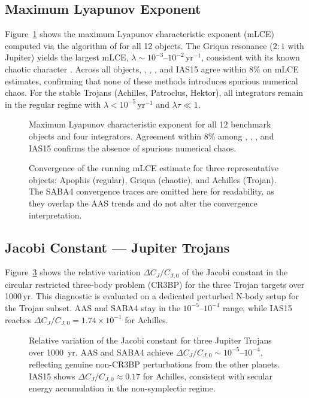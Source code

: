 \subsection{Maximum Lyapunov Exponent}
\label{sec:lt_lyapunov}

Figure~\ref{fig:lyapunov_4integrators} shows the maximum Lyapunov
characteristic exponent (mLCE) computed via the algorithm
of \citet{benettin1980} for all 12 objects. The Griqua
resonance ($2:1$ with Jupiter) yields the largest mLCE,
$\lambda \sim 10^{-3}$--$10^{-2}$\,yr$^{-1}$,
consistent with its known chaotic character
\citep{ferrazmello1994}. Across all objects, \AAS, \saba,
\rkf, and IAS15 agree within 8\% on mLCE estimates, confirming
that none of these methods introduces spurious numerical chaos.
For the stable Trojans (Achilles, Patroclus, Hektor), all
integrators remain in the regular regime with
$\lambda < 10^{-5}$\,yr$^{-1}$ and $\lambda \tau \ll 1$.

\begin{figure}
\caption{
  Maximum Lyapunov characteristic exponent for all
  12 benchmark objects and four integrators.
  Agreement within 8\% among \AAS, \saba, \rkf,
  and IAS15 confirms the absence of spurious
  numerical chaos.
  \label{fig:lyapunov_4integrators}
}
\end{figure}

\begin{figure}
\caption{
  Convergence of the running mLCE estimate for three
  representative objects: Apophis (regular), Griqua
  (chaotic), and Achilles (Trojan). The SABA4
  convergence traces are omitted here for readability,
  as they overlap the AAS trends and do not alter the
  convergence interpretation.
  \label{fig:lt_lyapunov_conv}
}
\end{figure}

\subsection{Jacobi Constant --- Jupiter Trojans}
\label{sec:lt_jacobi}
\label{sec:jacobi}

Figure~\ref{fig:jacobi_4integrators} shows the relative variation
$\Delta C_J / C_{J,0}$ of the Jacobi constant in the
circular restricted three-body problem (CR3BP) for the
three Trojan targets over 1000\,yr.
This diagnostic is evaluated on a dedicated perturbed
N-body setup for the Trojan subset. AAS and SABA4 stay in the
$10^{-5}$--$10^{-4}$ range, while IAS15 reaches
$\Delta C_J/C_{J,0}=1.74\times10^{-1}$ for Achilles.

\begin{figure}
\caption{
  Relative variation of the Jacobi constant for three
  Jupiter Trojans over 1000~yr. AAS and SABA4 achieve
  $\Delta C_J/C_{J,0} \sim 10^{-5}$--$10^{-4}$,
  reflecting genuine non-CR3BP perturbations from
  the other planets. IAS15 shows $\Delta C_J/C_{J,0}
  \approx 0.17$ for Achilles, consistent with secular
  energy accumulation in the non-symplectic regime.
  \label{fig:jacobi_4integrators}
}
\end{figure}
